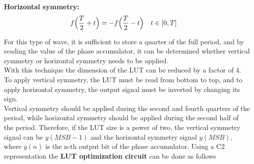 \begin{center}
{\begin{minipage}{0.45\textwidth}
{{                    \textbf{Horizontal symmetry:}
                    \[
                        \begin{aligned}
                            f\Bigl(\frac{T}{2}+t\Bigr) &= -f\Bigl(\frac{T}{2}-t\Bigr) \quad t \in [0,T]
                        \end{aligned}
                    \]
                }
            }
        \end{minipage}
    }
    \vspace*{0.5cm} 

\end{center}

\noindent
For this type of wave, it is sufficient to store a quarter of the full period, and by reading the value of the phase accumulator, it can be determined whether vertical symmetry or horizontal symmetry needs to be applied.  \\
With this technique the dimension of the LUT can be reduced by a factor of 4. \\
To apply vertical symmetry, the LUT must be read from bottom to top, and to apply horizontal symmetry, the output signal must be inverted by changing its sign.  \\
Vertical symmetry should be applied during the second and fourth quarters of the period, while horizontal symmetry should be applied during the second half of the period. Therefore, if the LUT size is a power of two, the vertical symmetry signal can be \(y(MSB-1)\) and the horizontal symmetry signal \(y(MSB)\), where \(y(n)\) is the n-th output bit of the phase accumulator.
Using a C2 representation the \textbf{LUT optimization circuit} can be done as follows

